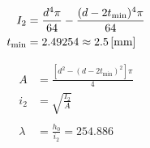 \begin{align*}
	I_2 &= \frac{d^4 \pi}{64} - \frac{(d-2t_\text{min})^4 \pi}{64} \\
	t_\text{min} &= 2.49254 \approx \mm{2.5}
\end{align*}

\begin{align*}
	A &= \frac{\left[d^2 - (d-2t_\text{min})^2\right] \pi}{4} \\
	i_2 &= \sqrt{\frac{I_2}{A}} \\ \\
	\lambda &= \frac{h_0}{i_2} = 254.886
\end{align*}
